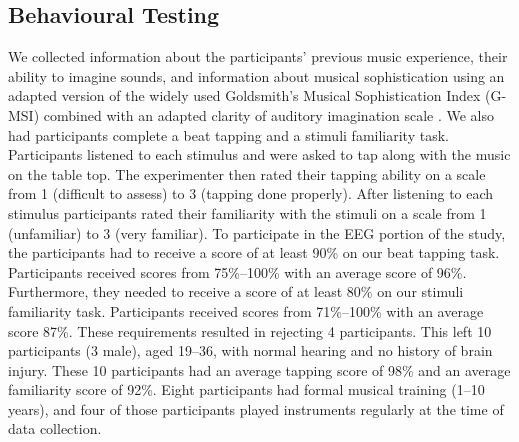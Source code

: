 \subsection{Behavioural Testing}
We collected information about the participants' previous music experience, their ability to imagine sounds, and information about musical sophistication using an adapted version of the widely used Goldsmith's Musical Sophistication Index (G-MSI) \cite{mullensiefen_musicality_2014} combined with an adapted clarity of auditory imagination scale \cite{willander_imagery_scale_2010}. 
We also had participants complete a beat tapping and a stimuli familiarity task. 
Participants listened to each stimulus and were asked to tap along with the music on the table top. The experimenter then rated their tapping ability on a scale from 1 (difficult to assess) to 3 (tapping done properly). 
After listening to each stimulus participants rated their familiarity with the stimuli on a scale from 1 (unfamiliar) to 3 (very familiar).
To participate in the \ac{EEG} portion of the study, the participants had to receive a score of at least 90\% on our beat tapping task. Participants received scores from 75\%--100\% with an average score of 96\%.
Furthermore, they needed to receive a score of at least 80\% on our stimuli familiarity task. 
Participants received scores from 71\%--100\% with an average score 87\%.
These requirements resulted in rejecting 4 participants.
This left 10 participants (3 male), aged 19--36, with normal hearing and no history of brain injury. 
These 10 participants had an average tapping score of 98\% and an average familiarity score of 92\%.
Eight participants had formal musical training (1--10 years), and four of those participants played instruments regularly at the time of data collection.

